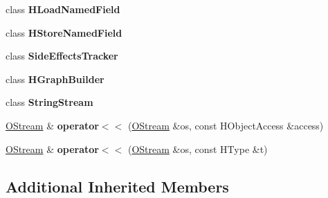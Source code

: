 \begin{DoxyCompactItemize}
\item 
\hypertarget{classv8_1_1internal_1_1_v8___f_i_n_a_l_a51e0d0e57bb57f80b32e326dfc27dac4}{}class {\bfseries H\+Load\+Named\+Field}\label{classv8_1_1internal_1_1_v8___f_i_n_a_l_a51e0d0e57bb57f80b32e326dfc27dac4}

\item 
\hypertarget{classv8_1_1internal_1_1_v8___f_i_n_a_l_ad3565a7547650e795b6e7028ea7437a1}{}class {\bfseries H\+Store\+Named\+Field}\label{classv8_1_1internal_1_1_v8___f_i_n_a_l_ad3565a7547650e795b6e7028ea7437a1}

\item 
\hypertarget{classv8_1_1internal_1_1_v8___f_i_n_a_l_a79af41808690c90c6bc5a0ea5445945f}{}class {\bfseries Side\+Effects\+Tracker}\label{classv8_1_1internal_1_1_v8___f_i_n_a_l_a79af41808690c90c6bc5a0ea5445945f}

\item 
\hypertarget{classv8_1_1internal_1_1_v8___f_i_n_a_l_a591bb60c51048ff225acce68488b9fa4}{}class {\bfseries H\+Graph\+Builder}\label{classv8_1_1internal_1_1_v8___f_i_n_a_l_a591bb60c51048ff225acce68488b9fa4}

\item 
\hypertarget{classv8_1_1internal_1_1_v8___f_i_n_a_l_a1e02d3fa3aed0e038625842888f70c2a}{}class {\bfseries String\+Stream}\label{classv8_1_1internal_1_1_v8___f_i_n_a_l_a1e02d3fa3aed0e038625842888f70c2a}

\item 
\hypertarget{classv8_1_1internal_1_1_v8___f_i_n_a_l_ac1e499b0a912b5a4377b1e88e96bf2cb}{}\hyperlink{classv8_1_1internal_1_1_o_stream}{O\+Stream} \& {\bfseries operator$<$$<$} (\hyperlink{classv8_1_1internal_1_1_o_stream}{O\+Stream} \&os, const H\+Object\+Access \&access)\label{classv8_1_1internal_1_1_v8___f_i_n_a_l_ac1e499b0a912b5a4377b1e88e96bf2cb}

\item 
\hypertarget{classv8_1_1internal_1_1_v8___f_i_n_a_l_a4ac7d53e07274e91d22ad9f1f326ff5b}{}\hyperlink{classv8_1_1internal_1_1_o_stream}{O\+Stream} \& {\bfseries operator$<$$<$} (\hyperlink{classv8_1_1internal_1_1_o_stream}{O\+Stream} \&os, const H\+Type \&t)\label{classv8_1_1internal_1_1_v8___f_i_n_a_l_a4ac7d53e07274e91d22ad9f1f326ff5b}

\end{DoxyCompactItemize}
\subsection*{Additional Inherited Members}


